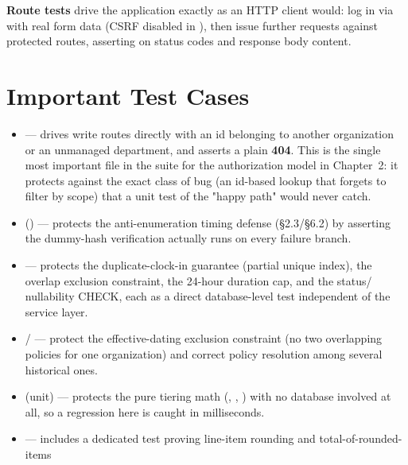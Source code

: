 \textbf{Route tests} drive the application exactly as an HTTP client
would: log in via  with real form data (CSRF
disabled in ), then issue further requests against
protected routes, asserting on status codes and response body content.

\section{Important Test Cases}

\begin{itemize}
  \item \textbf{} --- drives write routes
        directly with an id belonging to another organization or an
        unmanaged department, and asserts a plain \textbf{404}. This is
        the single most important file in the suite for the
        authorization model in Chapter~2: it protects against the
        exact class of bug (an id-based lookup that forgets to filter
        by scope) that a unit test of the "happy path" would never
        catch.
  \item \textbf{}
        () --- protects the
        anti-enumeration timing defense (\S2.3/\S6.2) by asserting the
        dummy-hash verification actually runs on every failure branch.
  \item \textbf{} --- protects
        the duplicate-clock-in guarantee (partial unique index), the
        overlap exclusion constraint, the 24-hour duration cap, and the
        status/ nullability CHECK, each as a direct
        database-level test independent of the service layer.
  \item \textbf{} /
        \textbf{} --- protect the
        effective-dating exclusion constraint (no two overlapping
        policies for one organization) and correct policy resolution
        among several historical ones.
  \item \textbf{} (unit) --- protects the pure
        tiering math (, ,
        ) with no database involved at
        all, so a regression here is caught in milliseconds.
  \item \textbf{} --- includes a
        dedicated test proving line-item rounding and total-of-rounded-items

\end{itemize}
